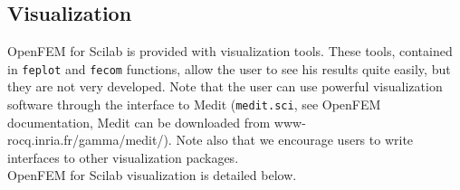 \subsection{Visualization}
OpenFEM for Scilab is provided with visualization tools. These tools, contained in \verb+feplot+ and \verb+fecom+ functions, allow the user to see his results quite easily, but they are not very developed. Note that the user can use powerful visualization software through the interface to Medit (\verb+medit.sci+, see OpenFEM documentation, Medit can be downloaded from www-rocq.inria.fr/gamma/medit/). Note also that we encourage users to write interfaces to other visualization packages.\\
OpenFEM for Scilab visualization is detailed below.
